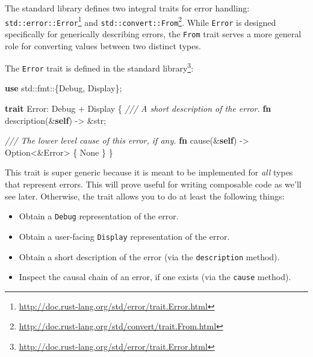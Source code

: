 \documentclass[a4paper,]{book}
\newenvironment{Shaded}{\begin{snugshade}}{\end{snugshade}}
\newcommand{\KeywordTok}[1]{\textcolor[rgb]{0.13,0.29,0.53}{\textbf{{#1}}}}
\newcommand{\DataTypeTok}[1]{\textcolor[rgb]{0.13,0.29,0.53}{{#1}}}
\newcommand{\ConstantTok}[1]{\textcolor[rgb]{0.00,0.00,0.00}{{#1}}}
\newcommand{\CommentTok}[1]{\textcolor[rgb]{0.56,0.35,0.01}{\textit{{#1}}}}
\newcommand{\BuiltInTok}[1]{{#1}}
\newcommand{\NormalTok}[1]{{#1}}
\renewcommand{\href}[2]{#2\footnote{\url{#1}}}
\providecommand{\tightlist}{%
  \setlength{\itemsep}{0pt}\setlength{\parskip}{0pt}}
\begin{document}

The standard library defines two integral traits for error handling:
\href{http://doc.rust-lang.org/std/error/trait.Error.html}{\texttt{std::error::Error}}
and
\href{http://doc.rust-lang.org/std/convert/trait.From.html}{\texttt{std::convert::From}}.
While \texttt{Error} is designed specifically for generically describing
errors, the \texttt{From} trait serves a more general role for
converting values between two distinct types.


The \texttt{Error} trait is
\href{http://doc.rust-lang.org/std/error/trait.Error.html}{defined in
the standard library}:

\begin{Shaded}
\begin{Highlighting}[]
\KeywordTok{use} \NormalTok{std::fmt::\{}\BuiltInTok{Debug}\NormalTok{, }\BuiltInTok{Display}\NormalTok{\};}

\KeywordTok{trait} \NormalTok{Error: }\BuiltInTok{Debug} \NormalTok{+ }\BuiltInTok{Display} \NormalTok{\{}
  \CommentTok{/// A short description of the error.}
  \KeywordTok{fn} \NormalTok{description(&}\KeywordTok{self}\NormalTok{) -> &}\DataTypeTok{str}\NormalTok{;}

  \CommentTok{/// The lower level cause of this error, if any.}
  \KeywordTok{fn} \NormalTok{cause(&}\KeywordTok{self}\NormalTok{) -> }\DataTypeTok{Option}\NormalTok{<&Error> \{ }\ConstantTok{None} \NormalTok{\}}
\NormalTok{\}}
\end{Highlighting}
\end{Shaded}

This trait is super generic because it is meant to be implemented for
\emph{all} types that represent errors. This will prove useful for
writing composable code as we'll see later. Otherwise, the trait allows
you to do at least the following things:

\begin{itemize}
\tightlist
\item
  Obtain a \texttt{Debug} representation of the error.
\item
  Obtain a user-facing \texttt{Display} representation of the error.
\item
  Obtain a short description of the error (via the \texttt{description}
  method).
\item
  Inspect the causal chain of an error, if one exists (via the
  \texttt{cause} method).
\end{itemize}
\end{document}
